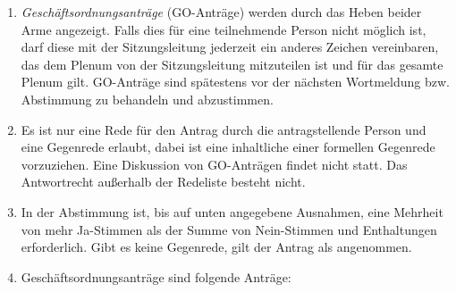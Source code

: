 \documentclass[
  ngerman,
  a4paper,
  oneside]{scrartcl}
\providecommand{\tightlist}{%
  \setlength{\itemsep}{0pt}\setlength{\parskip}{0pt}}
\begin{document}
\begin{enumerate}
\def\labelenumi{\arabic{enumi}.}
\tightlist
\item
  \emph{Geschäftsordnungsanträge} (GO-Anträge) werden durch das Heben
  beider Arme angezeigt. Falls dies für eine teilnehmende Person nicht
  möglich ist, darf diese mit der Sitzungsleitung jederzeit ein anderes
  Zeichen vereinbaren, das dem Plenum von der Sitzungsleitung
  mitzuteilen ist und für das gesamte Plenum gilt. GO-Anträge sind
  spätestens vor der nächsten Wortmeldung bzw. Abstimmung zu behandeln
  und abzustimmen.
\item
  Es ist nur eine Rede für den Antrag durch die antragstellende Person
  und eine Gegenrede erlaubt, dabei ist eine inhaltliche einer formellen
  Gegenrede vorzuziehen. Eine Diskussion von GO-Anträgen findet nicht
  statt. Das Antwortrecht außerhalb der Redeliste besteht nicht.
\item
  In der Abstimmung ist, bis auf unten angegebene Ausnahmen, eine
  Mehrheit von mehr Ja-Stimmen als der Summe von Nein-Stimmen und
  Enthaltungen erforderlich. Gibt es keine Gegenrede, gilt der Antrag
  als angenommen.
\item
  Geschäftsordnungsanträge sind folgende Anträge:


\end{enumerate}
\end{document}
